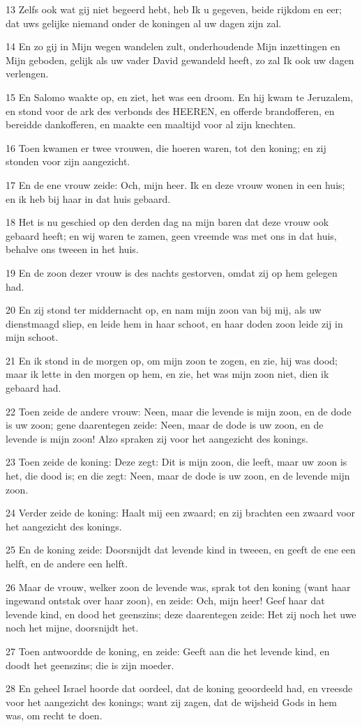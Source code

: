 \par 13 Zelfs ook wat gij niet begeerd hebt, heb Ik u gegeven, beide rijkdom en eer; dat uws gelijke niemand onder de koningen al uw dagen zijn zal.
\par 14 En zo gij in Mijn wegen wandelen zult, onderhoudende Mijn inzettingen en Mijn geboden, gelijk als uw vader David gewandeld heeft, zo zal Ik ook uw dagen verlengen.
\par 15 En Salomo waakte op, en ziet, het was een droom. En hij kwam te Jeruzalem, en stond voor de ark des verbonds des HEEREN, en offerde brandofferen, en bereidde dankofferen, en maakte een maaltijd voor al zijn knechten.
\par 16 Toen kwamen er twee vrouwen, die hoeren waren, tot den koning; en zij stonden voor zijn aangezicht.
\par 17 En de ene vrouw zeide: Och, mijn heer. Ik en deze vrouw wonen in een huis; en ik heb bij haar in dat huis gebaard.
\par 18 Het is nu geschied op den derden dag na mijn baren dat deze vrouw ook gebaard heeft; en wij waren te zamen, geen vreemde was met ons in dat huis, behalve ons tweeen in het huis.
\par 19 En de zoon dezer vrouw is des nachts gestorven, omdat zij op hem gelegen had.
\par 20 En zij stond ter middernacht op, en nam mijn zoon van bij mij, als uw dienstmaagd sliep, en leide hem in haar schoot, en haar doden zoon leide zij in mijn schoot.
\par 21 En ik stond in de morgen op, om mijn zoon te zogen, en zie, hij was dood; maar ik lette in den morgen op hem, en zie, het was mijn zoon niet, dien ik gebaard had.
\par 22 Toen zeide de andere vrouw: Neen, maar die levende is mijn zoon, en de dode is uw zoon; gene daarentegen zeide: Neen, maar de dode is uw zoon, en de levende is mijn zoon! Alzo spraken zij voor het aangezicht des konings.
\par 23 Toen zeide de koning: Deze zegt: Dit is mijn zoon, die leeft, maar uw zoon is het, die dood is; en die zegt: Neen, maar de dode is uw zoon, en de levende mijn zoon.
\par 24 Verder zeide de koning: Haalt mij een zwaard; en zij brachten een zwaard voor het aangezicht des konings.
\par 25 En de koning zeide: Doorsnijdt dat levende kind in tweeen, en geeft de ene een helft, en de andere een helft.
\par 26 Maar de vrouw, welker zoon de levende was, sprak tot den koning (want haar ingewand ontstak over haar zoon), en zeide: Och, mijn heer! Geef haar dat levende kind, en dood het geenszins; deze daarentegen zeide: Het zij noch het uwe noch het mijne, doorsnijdt het.
\par 27 Toen antwoordde de koning, en zeide: Geeft aan die het levende kind, en doodt het geenszins; die is zijn moeder.
\par 28 En geheel Israel hoorde dat oordeel, dat de koning geoordeeld had, en vreesde voor het aangezicht des konings; want zij zagen, dat de wijsheid Gods in hem was, om recht te doen.

